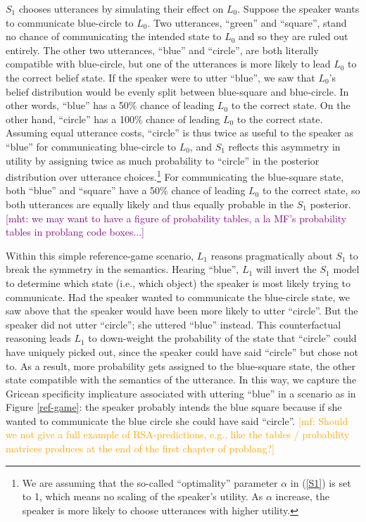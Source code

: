 \documentclass{sp}
\newcommand{\mf}[1]{\textcolor{orange}{[mf: #1]}}
\newcommand{\mht}[1]{\textcolor{purple}{[mht: #1]}}
\begin{document}
$S_1$ chooses utterances by simulating their effect on $L_0$. Suppose the speaker wants to communicate blue-circle to $L_0$. Two utterances, ``green'' and ``square'', stand no chance of communicating the intended state to $L_0$ and so they are ruled out entirely. The other two utterances, ``blue'' and ``circle'', are both literally compatible with blue-circle, but one of the utterances is more likely to lead $L_0$ to the correct belief state. If the speaker were to utter ``blue'', we saw that $L_0$'s belief distribution would be evenly split between blue-square and blue-circle. In other words, ``blue'' has a 50\% chance of leading $L_0$ to the correct state. On the other hand, ``circle'' has a 100\% chance of leading $L_0$ to the correct state. Assuming equal utterance costs, ``circle'' is thus twice as useful to the speaker as ``blue'' for communicating blue-circle to $L_0$, and $S_1$ reflects this asymmetry in utility by assigning twice as much probability to ``circle'' in the posterior distribution over utterance choices.\footnote{We are assuming that the so-called ``optimality'' parameter $\alpha$ in (\ref{S1}) is set to 1, which means no scaling of the speaker's utility. As $\alpha$ increase, the speaker is more likely to choose utterances with higher utility.} For communicating the blue-square state, both ``blue'' and ``square'' have a 50\% chance of leading $L_0$ to the correct state, so both utterances are equally likely and thus equally probable in the $S_1$ posterior.
\mht{we may want to have a figure of probability tables, a la MF's probability tables in problang code boxes...}

Within this simple reference-game scenario, $L_1$ reasons pragmatically about $S_1$ to break the symmetry in the semantics. Hearing ``blue'', $L_1$ will invert the $S_1$ model to determine which state (i.e., which object) the speaker is most likely trying to communicate. Had the speaker wanted to communicate the blue-circle state, we saw above that the speaker would have been more likely to utter ``circle''. But the speaker did not utter ``circle''; she uttered ``blue'' instead. This counterfactual reasoning leads $L_1$ to down-weight the probability of the state that ``circle'' could have uniquely picked out, since the speaker could have said ``circle'' but chose not to. As a result, more probability gets assigned to the blue-square state, the other state compatible with the semantics of the utterance. In this way, we capture the Gricean specificity implicature associated with uttering ``blue'' in a scenario as in Figure \ref{ref-game}: the speaker probably intends the blue square because if she wanted to communicate the blue circle she could have said ``circle''.
\mf{Should we not give a full example of RSA-predictions, e.g., like the tables / probability matrices produces at the end of the first chapter of problang?}
\end{document}

